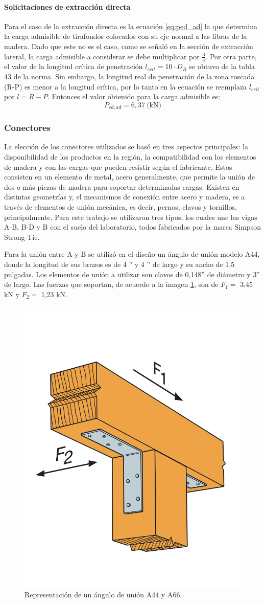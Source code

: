 \paragraph{Solicitaciones de extracción directa}
Para el caso de la extracción directa es la ecuación \ref{eq:ped_ad} la que determina la carga admisible de tirafondos colocados con su eje normal a las fibras de la madera. Dado que este no es el caso, como se señaló en la sección de extracción lateral, la carga admisible a considerar se debe multiplicar por $\frac{3}{4}$. Por otra parte, el valor de la longitud crítica de penetración $l_{crit}=10\cdot D_R$ se obtuvo de la tabla 43 de la norma. Sin embargo, la longitud real de penetración de la zona roscada (R-P) es menor a la longitud crítica, por lo tanto en la ecuación se reemplaza $l_{crit}$ por $l = R-P$. Entonces el valor obtenido para la carga admisible es:
\begin{equation}
	P_{ed,ad} = 6,37 \: \text{(kN)}
\end{equation} 

\subsubsection{Conectores}
La elección de los conectores utilizados se basó en tres aspectos principales: la disponibilidad de los productos en la región, la compatibilidad con los elementos de madera y con las cargas que pueden resistir según el fabricante. Estos consisten en un elemento de metal, acero generalmente, que permite la unión de dos o más piezas de madera para soportar determinadas cargas. Existen en distintas geometrías y, el mecanismos de conexión entre acero y madera, es a través de elementos de unión mecánica, es decir, pernos, clavos y tornillos, principalmente. Para este trabajo se utilizaron tres tipos, los cuales une las vigas A-B, B-D y B con el suelo del laboratorio, todos fabricados por la marca Simpson Strong-Tie.

Para la unión entre A y B se utilizó en el diseño un ángulo de unión modelo A44, donde la longitud de sus brazos es de 4 '' y 4 '' de largo y su ancho de 1,5 pulgadas. Los elementos de unión a utilizar son clavos de 0,148'' de diámetro y 3'' de largo. Las fuerzas que soportan, de acuerdo a la imagen \ref{fig:a24}, son de $F_1=$ 3,45 kN y $F_2=$ 1,23 kN. 

\begin{figure}[h]
\centering
\includegraphics[width=0.3\linewidth]{Imagenes/a24.pdf}
\caption{Representación de un ángulo de unión A44 y A66. \cite{angleconnector}}
\label{fig:a24}
\end{figure} 

